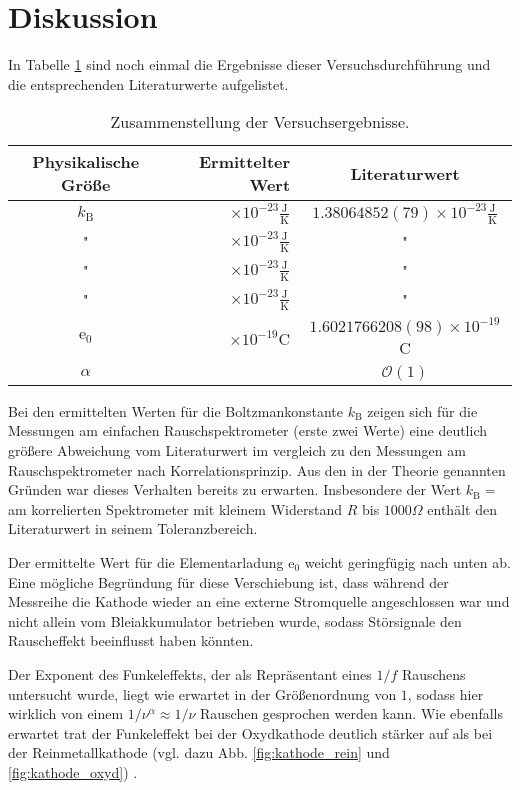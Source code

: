 
\clearpage
\section{Diskussion}
In Tabelle \ref{tab:ergebnisse} sind noch einmal die Ergebnisse
dieser Versuchsdurchführung und die entsprechenden Literaturwerte
aufgelistet.

\begin{table}[h]
\centering
\begin{tabular}{crc}
\toprule \midrule
Physikalische Größe & Ermittelter Wert & Literaturwert \\
\midrule
$k_\text{B}$ 	& 
$\times 10^{-23}\frac{\text{J}}{\text{K}}$ & $1.380 648
52(79)\times 10^{-23}\frac{\text{J}}{\text{K}}$\cite{PDG}		\\
"  				& 
$\times 10^{-23}\frac{\text{J}}{\text{K}}$ & "		\\
"  				& 
$\times 10^{-23}\frac{\text{J}}{\text{K}}$ & "		\\
"  				& 
$\times 10^{-23}\frac{\text{J}}{\text{K}}$ & "		\\
$\text{e}_0$		& 
$\times 10^{-19}\text{C}$ & $1.602 176 6208(98)\times
10^{-19}$C\cite{PDG} \\
$\alpha$			& 
&$\mathcal{O}(1)$\\
\midrule
\bottomrule
\end{tabular}
\caption{Zusammenstellung der Versuchsergebnisse.}
\label{tab:ergebnisse}
\end{table}


Bei den ermittelten Werten für die Boltzmankonstante $k_\text{B}$
zeigen sich für die Messungen am einfachen Rauschspektrometer
(erste zwei Werte) eine deutlich größere Abweichung vom Literaturwert
im vergleich zu den Messungen am Rauschspektrometer nach
Korrelationsprinzip. Aus den in der Theorie genannten Gründen
war dieses Verhalten bereits zu erwarten. Insbesondere der Wert
$k_\text{B}=$ am korrelierten Spektrometer
mit kleinem Widerstand $R$ bis $1000\Omega$ enthält den Literaturwert
in seinem Toleranzbereich.

Der ermittelte Wert für die Elementarladung $\text{e}_0$ weicht
geringfügig nach unten ab. Eine mögliche Begründung für diese
Verschiebung ist, dass während der Messreihe die Kathode wieder
an eine externe Stromquelle angeschlossen war und nicht allein
vom Bleiakkumulator betrieben wurde, sodass Störsignale den
Rauscheffekt beeinflusst haben könnten.

Der Exponent des Funkeleffekts, der als Repräsentant eines $1/f$
Rauschens untersucht wurde, liegt wie erwartet in der Größenordnung
von $1$, sodass hier wirklich von einem $1/\nu^\alpha\approx 1/\nu$
Rauschen gesprochen werden kann. Wie ebenfalls erwartet trat der
Funkeleffekt bei der Oxydkathode deutlich stärker auf als bei
der Reinmetallkathode (vgl. dazu Abb. \ref{fig:kathode_rein} und
\ref{fig:kathode_oxyd})  .

